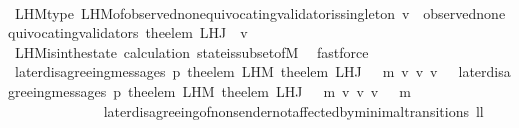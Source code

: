 \begin{isabellebody}
\ \ \ \ \ \ \ \ \ \ \isamarkupfalse%
\ L{\isacharunderscore}H{\isacharunderscore}M{\isacharunderscore}type\ L{\isacharunderscore}H{\isacharunderscore}M{\isacharunderscore}of{\isacharunderscore}observed{\isacharunderscore}non{\isacharunderscore}equivocating{\isacharunderscore}validator{\isacharunderscore}is{\isacharunderscore}singleton\ {\isacartoucheopen}v{\isacharprime}\ {\isasymin}\ observed{\isacharunderscore}non{\isacharunderscore}equivocating{\isacharunderscore}validators\ {\isacharparenleft}the{\isacharunderscore}elem\ {\isacharparenleft}L{\isacharunderscore}H{\isacharunderscore}J\ {\isasymsigma}\ v{\isacharparenright}{\isacharparenright}{\isacartoucheclose}\isanewline
\ \ \ \ \ \ \ \ \ \ \isamarkupfalse%
\ L{\isacharunderscore}H{\isacharunderscore}M{\isacharunderscore}is{\isacharunderscore}in{\isacharunderscore}the{\isacharunderscore}state\ calculation{\isacharparenleft}{}{\isacharparenright}\ state{\isacharunderscore}is{\isacharunderscore}subset{\isacharunderscore}of{\isacharunderscore}M\ \isamarkupfalse%
\ fastforce\isanewline
\ \ \ \ \ \ \ \ \isamarkupfalse%
\ {\isachardoublequoteopen}later{\isacharunderscore}disagreeing{\isacharunderscore}messages\ {\isacharparenleft}p{\isacharcomma}\ the{\isacharunderscore}elem\ {\isacharparenleft}L{\isacharunderscore}H{\isacharunderscore}M\ {\isacharparenleft}the{\isacharunderscore}elem\ {\isacharparenleft}L{\isacharunderscore}H{\isacharunderscore}J\ {\isacharparenleft}{\isasymsigma}\ {\isasymunion}\ {\isacharbraceleft}m{\isacharbraceright}{\isacharparenright}\ v{\isacharparenright}{\isacharparenright}\ v{\isacharprime}{\isacharparenright}{\isacharcomma}\ v{\isacharprime}{\isacharcomma}\ {\isasymsigma}{\isacharparenright}\ {\isacharequal}\ later{\isacharunderscore}disagreeing{\isacharunderscore}messages\ {\isacharparenleft}p{\isacharcomma}\ the{\isacharunderscore}elem\ {\isacharparenleft}L{\isacharunderscore}H{\isacharunderscore}M\ {\isacharparenleft}the{\isacharunderscore}elem\ {\isacharparenleft}L{\isacharunderscore}H{\isacharunderscore}J\ {\isacharparenleft}{\isasymsigma}\ {\isasymunion}\ {\isacharbraceleft}m{\isacharbraceright}{\isacharparenright}\ v{\isacharparenright}{\isacharparenright}\ v{\isacharprime}{\isacharparenright}{\isacharcomma}\ v{\isacharprime}{\isacharcomma}\ {\isasymsigma}\ {\isasymunion}\ {\isacharbraceleft}m{\isacharbraceright}{\isacharparenright}{\isachardoublequoteclose}\ \ \ \ \ \ \ \ \ \ \ \ \ \ \isanewline
\ \ \ \ \ \ \ \ \ \ \ \ \isamarkupfalse%
\ later{\isacharunderscore}disagreeing{\isacharunderscore}of{\isacharunderscore}non{\isacharunderscore}sender{\isacharunderscore}not{\isacharunderscore}affected{\isacharunderscore}by{\isacharunderscore}minimal{\isacharunderscore}transitions\ ll{}\ \isanewline

\end{isabellebody}
